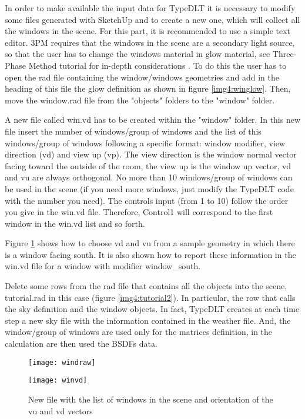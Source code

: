In order to make available the input data for TypeDLT it is necessary to modify some files generated with SketchUp and to create a new one, which will collect all the windows in the scene. For this part, it is recommended to use a simple text editor. 3PM requires that the windows in the scene are a secondary light source, so that the user has to change the windows material in glow material, see Three-Phase Method tutorial for in-depth considerations \cite{3ph_tut}. To do this the user has to open the rad file containing the window/windows geometries and add in the heading of this file the glow definition as shown in figure \ref{img4:winglow}. Then, move the window.rad file from the "objects" folders to the "window" folder.

A new file called {\color{blue} win.vd} has to be created within the "window" folder. In this new file insert the number of windows/group of windows and the list of this windows/group of windows following a specific format: window modifier, view direction (vd) and view up (vp). The view direction is the window normal vector facing toward the outside of the room, the view up is the window up vector, vd and vu are always orthogonal. No more than 10 windows/group of windows can be used in the scene (if you need more windows, just modify the TypeDLT code with the number you need). The controls input (from 1 to 10) follow the order you give in the win.vd file. Therefore, Control1 will correspond to the first window in the win.vd list and so forth.

Figure \ref{img4:windoworient} shows how to choose vd and vu from a sample geometry in which there is a window facing south. It is also shown how to report these information in the win.vd file for a window with modifier window\_south. 

Delete some rows from the rad file that contains all the objects into the scene, tutorial.rad in this case (figure \ref{img4:tutorial2}). In particular, the row that calls the sky definition and the window objects. In fact, TypeDLT creates at each time step a new sky file with the information contained in the weather file. And, the window/group of windows are used only for the matrices definition, in the calculation are then used the BSDFs data.

\begin{figure}[h]
\centering
\begin{minipage}[c]{0.6\linewidth}
\texttt{[image: windraw]}
\end{minipage}
\quad
\begin{minipage}[c]{0.3\linewidth}
\texttt{[image: winvd]}
\end{minipage}
\caption{\label{img4:windoworient} New file with the list of windows in the scene and orientation of the vu and vd vectors}
\end{figure}


